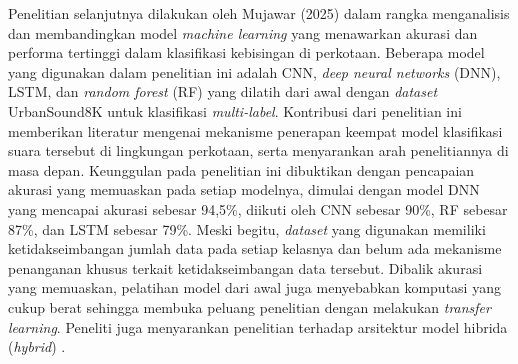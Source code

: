 Penelitian selanjutnya dilakukan oleh Mujawar (2025) dalam rangka menganalisis dan membandingkan model \textit{machine learning} yang menawarkan akurasi dan performa tertinggi dalam klasifikasi kebisingan di perkotaan. 
Beberapa model yang digunakan dalam penelitian ini adalah CNN, \textit{deep neural networks} (DNN), LSTM, dan \textit{random forest} (RF) yang dilatih dari awal dengan \textit{dataset} UrbanSound8K untuk klasifikasi \textit{multi-label}.
Kontribusi dari penelitian ini memberikan literatur mengenai mekanisme penerapan keempat model klasifikasi suara tersebut di lingkungan perkotaan, serta menyarankan arah penelitiannya di masa depan.
Keunggulan pada penelitian ini dibuktikan dengan pencapaian akurasi yang memuaskan pada setiap modelnya, dimulai dengan model DNN yang mencapai akurasi sebesar 94,5\%, diikuti oleh CNN sebesar 90\%, RF sebesar 87\%, dan LSTM sebesar 79\%.
Meski begitu, \textit{dataset} yang digunakan memiliki ketidakseimbangan jumlah data pada setiap kelasnya dan belum ada mekanisme penanganan khusus terkait ketidakseimbangan data tersebut.
Dibalik akurasi yang memuaskan, pelatihan model dari awal juga menyebabkan komputasi yang cukup berat sehingga membuka peluang penelitian dengan melakukan \textit{transfer learning}. 
Peneliti juga menyarankan penelitian terhadap arsitektur model hibrida (\textit{hybrid}) \cite{mujawar2025urban}. \par

